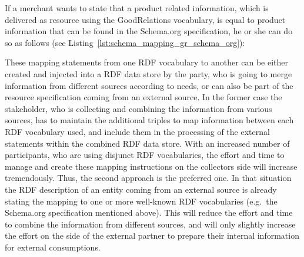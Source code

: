 If a merchant wants to state that a product related information, which is delivered as resource using the GoodRelations vocabulary, is equal to product information that can be found in the Schema.org specification, he or she can do so as follows (see Listing~\ref{lst:schema_mapping_gr_schema_org}): \@


These mapping statements from one \gls{RDF} vocabulary to another can be either created and injected into a \gls{RDF} data store by the party, who is going to merge information from different sources according to needs, or can also be part of the resource specification coming from an external source. In the former case the stakeholder, who is collecting and combining the information from various sources, has to maintain the additional triples to map information between each \gls{RDF} vocabulary used, and include them in the processing of the external statements within the combined \gls{RDF} data store. With an increased number of participants, who are using disjunct \gls{RDF} vocabularies, the effort and time to manage and create these mapping instructions on the collectors side will increase tremendously. Thus, the second approach is the preferred one. In that situation the \gls{RDF} description of an entity coming from an external source is already stating the mapping to one or more well-known \gls{RDF} vocabularies (e.g.\ the Schema.org specification mentioned above). This will reduce the effort and time to combine the information from different sources, and will only slightly increase the effort on the side of the external partner to prepare their internal information for external consumptions.


